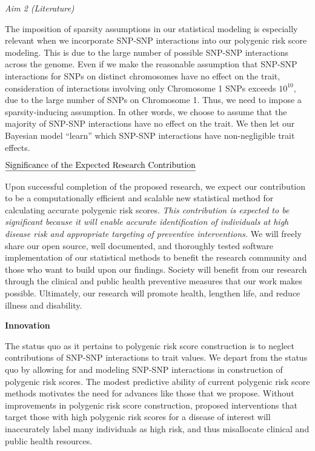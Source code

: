 \documentclass[
  11pt,
  letterpaper,
  DIV=11,
  numbers=noendperiod]{scrartcl}
\begin{document}
\emph{Aim 2 (Literature)}

The imposition of sparsity assumptions in our statistical modeling is
especially relevant when we incorporate SNP-SNP interactions into our
polygenic risk score modeling. This is due to the large number of
possible SNP-SNP interactions across the genome. Even if we make the
reasonable assumption that SNP-SNP interactions for SNPs on distinct
chromosomes have no effect on the trait, consideration of interactions
involving only Chromosome 1 SNPs exceeds \(10^{10}\), due to the large
number of SNPs on Chromosome 1. Thus, we need to impose a
sparsity-inducing assumption. In other words, we choose to assume that
the majority of SNP-SNP interactions have no effect on the trait. We
then let our Bayesian model ``learn'' which SNP-SNP interactions have
non-negligible trait effects.

\(\text{\underline{Significance of the Expected Research Contribution}}\)

Upon successful completion of the proposed research, we expect our
contribution to be a computationally efficient and scalable new
statistical method for calculating accurate polygenic risk scores.
\emph{This contribution is expected to be significant because it will
enable accurate identification of individuals at high disease risk and
appropriate targeting of preventive interventions.} We will freely share
our open source, well documented, and thoroughly tested software
implementation of our statistical methods to benefit the research
community and those who want to build upon our findings. Society will
benefit from our research through the clinical and public health
preventive measures that our work makes possible. Ultimately, our
research will promote health, lengthen life, and reduce illness and
disability.

\textbf{Innovation}

The status quo as it pertains to polygenic risk score construction is to
neglect contributions of SNP-SNP interactions to trait values. We depart
from the status quo by allowing for and modeling SNP-SNP interactions in
construction of polygenic risk scores. The modest predictive ability of
current polygenic risk score methods motivates the need for advances
like those that we propose. Without improvements in polygenic risk score
construction, proposed interventions that target those with high
polygenic risk scores for a disease of interest will inaccurately label
many individuals as high risk, and thus misallocate clinical and public
health resources.
\end{document}

